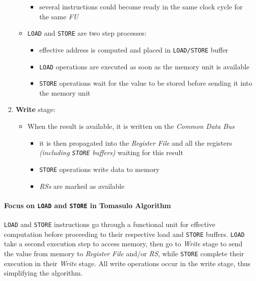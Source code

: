 \documentclass[english]{article}
\begin{document}
\begin{enumerate}
\begin{itemize}
\begin{itemize}
                  \item several instructions could become ready in the same clock cycle for the same \textit{FU}
                \end{itemize}
          \item \texttt{LOAD} and \texttt{STORE} are two step processes:
                \begin{itemize}
                  \item effective address is computed and placed in \texttt{LOAD/STORE} buffer
                  \item \texttt{LOAD} operations are executed as soon as the memory unit is available
                  \item \texttt{STORE} operations wait for the value to be stored before sending it into the memory unit
                \end{itemize}
        \end{itemize}
  \item \textbf{Write} stage:
        \begin{itemize}
          \item When the result is available, it is written on the \textit{Common Data Bus}
                \begin{itemize}
                  \item it is then propagated into the \textit{Register File} and all the registers \textit{(including \texttt{STORE} buffers)} waiting for this result
                  \item \texttt{STORE} operations write data to memory
                  \item \textit{RSs} are marked as available
                \end{itemize}
        \end{itemize}
\end{enumerate}

\paragraph{Focus on \texttt{LOAD} and \texttt{STORE} in Tomasulo Algorithm}

\texttt{LOAD} and \texttt{STORE} instructions go through a functional unit for effective computation before proceeding to their respective load and \texttt{STORE} buffers.
\texttt{LOAD} take a second execution step to access memory, then go to \textit{Write} stage to send the value from memory to \textit{Register File} and/or \textit{RS}, while \texttt{STORE} complete their execution in their \textit{Write} stage.
All write operations occur in the write stage, thus simplifying the algorithm.
\end{document}
